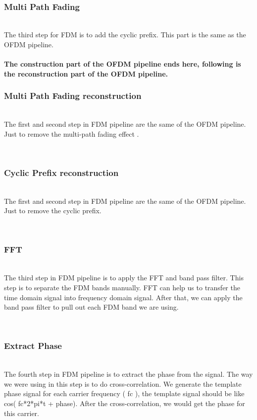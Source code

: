 \documentclass[twocolumn,conference]{IEEEtran}
\begin{document}
    \hfill\\\subsubsection{Multi Path Fading}\hfill\\
    \indent The third step for FDM is to add the cyclic prefix. This part is the same as the OFDM pipeline.
\\\\
\textbf{The construction part of the OFDM pipeline ends here, following is the reconstruction part of the OFDM pipeline.}
    \hfill\\\subsubsection{Multi Path Fading reconstruction}\hfill\\
    \indent The first and second step in FDM pipeline are the same of the OFDM pipeline. Just to remove the multi-path fading effect .

    \hfill\\\subsubsection{Cyclic Prefix reconstruction}\hfill\\
     \indent The first and second step in FDM pipeline are the same of the OFDM pipeline. Just to remove the cyclic prefix.

    \hfill\\\subsubsection{FFT}\hfill\\
    \indent The third step in FDM pipeline is to apply the FFT and band pass filter. This step is to separate the FDM bands manually. FFT can help us to transfer the time domain signal into frequency domain signal. After that, we can apply the band pass filter to pull out each FDM band we are using.

    \hfill\\\subsubsection{Extract Phase}\hfill\\
    \indent The fourth step in FDM pipeline is to extract the phase from the signal. The way we were using in this step is to do cross-correlation. We generate the template phase signal for each carrier frequency ( fc ), the template signal should be like cos( fc*2*pi*t + phase). After the cross-correlation, we would get the  phase for this carrier.
\end{document}
